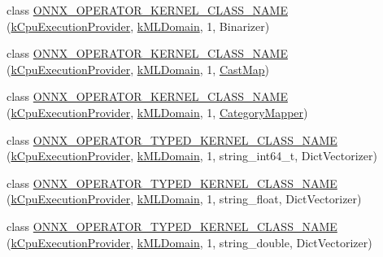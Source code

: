 \begin{DoxyCompactItemize}
\item 
class \mbox{\hyperlink{namespaceonnxruntime_1_1ml_af58d26bdbda62175c43e0f79662715d9}{O\+N\+N\+X\+\_\+\+O\+P\+E\+R\+A\+T\+O\+R\+\_\+\+K\+E\+R\+N\+E\+L\+\_\+\+C\+L\+A\+S\+S\+\_\+\+N\+A\+ME}} (\mbox{\hyperlink{namespaceonnxruntime_a394a3c7e50622de1f203a96df592060d}{k\+Cpu\+Execution\+Provider}}, \mbox{\hyperlink{namespaceonnxruntime_a76df7dd63759039fc62486d6691e70e5}{k\+M\+L\+Domain}}, 1, Binarizer)
\item 
class \mbox{\hyperlink{namespaceonnxruntime_1_1ml_a3b020f8dff14c8d400aaa49e9fa0ebe0}{O\+N\+N\+X\+\_\+\+O\+P\+E\+R\+A\+T\+O\+R\+\_\+\+K\+E\+R\+N\+E\+L\+\_\+\+C\+L\+A\+S\+S\+\_\+\+N\+A\+ME}} (\mbox{\hyperlink{namespaceonnxruntime_a394a3c7e50622de1f203a96df592060d}{k\+Cpu\+Execution\+Provider}}, \mbox{\hyperlink{namespaceonnxruntime_a76df7dd63759039fc62486d6691e70e5}{k\+M\+L\+Domain}}, 1, \mbox{\hyperlink{classonnxruntime_1_1ml_1_1CastMap}{Cast\+Map}})
\item 
class \mbox{\hyperlink{namespaceonnxruntime_1_1ml_a81774f8a761c11327fcb6e36e5c32ce1}{O\+N\+N\+X\+\_\+\+O\+P\+E\+R\+A\+T\+O\+R\+\_\+\+K\+E\+R\+N\+E\+L\+\_\+\+C\+L\+A\+S\+S\+\_\+\+N\+A\+ME}} (\mbox{\hyperlink{namespaceonnxruntime_a394a3c7e50622de1f203a96df592060d}{k\+Cpu\+Execution\+Provider}}, \mbox{\hyperlink{namespaceonnxruntime_a76df7dd63759039fc62486d6691e70e5}{k\+M\+L\+Domain}}, 1, \mbox{\hyperlink{classonnxruntime_1_1ml_1_1CategoryMapper}{Category\+Mapper}})
\item 
class \mbox{\hyperlink{namespaceonnxruntime_1_1ml_a8426e85b2c5788b8bfb5f09576245753}{O\+N\+N\+X\+\_\+\+O\+P\+E\+R\+A\+T\+O\+R\+\_\+\+T\+Y\+P\+E\+D\+\_\+\+K\+E\+R\+N\+E\+L\+\_\+\+C\+L\+A\+S\+S\+\_\+\+N\+A\+ME}} (\mbox{\hyperlink{namespaceonnxruntime_a394a3c7e50622de1f203a96df592060d}{k\+Cpu\+Execution\+Provider}}, \mbox{\hyperlink{namespaceonnxruntime_a76df7dd63759039fc62486d6691e70e5}{k\+M\+L\+Domain}}, 1, string\+\_\+int64\+\_\+t, Dict\+Vectorizer)
\item 
class \mbox{\hyperlink{namespaceonnxruntime_1_1ml_a275c2f7658ebac2b5fbdcde70b935f36}{O\+N\+N\+X\+\_\+\+O\+P\+E\+R\+A\+T\+O\+R\+\_\+\+T\+Y\+P\+E\+D\+\_\+\+K\+E\+R\+N\+E\+L\+\_\+\+C\+L\+A\+S\+S\+\_\+\+N\+A\+ME}} (\mbox{\hyperlink{namespaceonnxruntime_a394a3c7e50622de1f203a96df592060d}{k\+Cpu\+Execution\+Provider}}, \mbox{\hyperlink{namespaceonnxruntime_a76df7dd63759039fc62486d6691e70e5}{k\+M\+L\+Domain}}, 1, string\+\_\+float, Dict\+Vectorizer)
\item 
class \mbox{\hyperlink{namespaceonnxruntime_1_1ml_a29a6cd706aa997c3b309e1443c159a4d}{O\+N\+N\+X\+\_\+\+O\+P\+E\+R\+A\+T\+O\+R\+\_\+\+T\+Y\+P\+E\+D\+\_\+\+K\+E\+R\+N\+E\+L\+\_\+\+C\+L\+A\+S\+S\+\_\+\+N\+A\+ME}} (\mbox{\hyperlink{namespaceonnxruntime_a394a3c7e50622de1f203a96df592060d}{k\+Cpu\+Execution\+Provider}}, \mbox{\hyperlink{namespaceonnxruntime_a76df7dd63759039fc62486d6691e70e5}{k\+M\+L\+Domain}}, 1, string\+\_\+double, Dict\+Vectorizer)

\end{DoxyCompactItemize}
